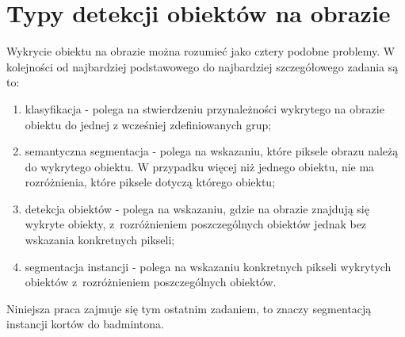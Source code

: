 \section{Typy detekcji obiektów na obrazie}
\label{sec:typy_detekcji}

Wykrycie obiektu na obrazie można rozumieć jako cztery podobne problemy.
W kolejności od najbardziej podstawowego do najbardziej szczegółowego zadania są to:

\begin{enumerate}
	\item klasyfikacja - polega na stwierdzeniu przynależności wykrytego na obrazie obiektu do jednej z wcześniej zdefiniowanych grup;
  \item semantyczna segmentacja - polega na wskazaniu, które piksele obrazu należą do wykrytego obiektu.
        W przypadku więcej niż jednego obiektu, nie ma rozróżnienia, które piksele dotyczą którego obiektu;
	\item detekcja obiektów - polega na wskazaniu, gdzie na obrazie znajdują się wykryte obiekty, z~rozróżnieniem poszczególnych obiektów jednak bez wskazania konkretnych pikseli;
	\item segmentacja instancji - polega na wskazaniu konkretnych pikseli wykrytych obiektów z~rozróżnieniem poszczególnych obiektów.
\end{enumerate}

Niniejsza praca zajmuje się tym ostatnim zadaniem, to znaczy segmentacją instancji kortów do badmintona.

